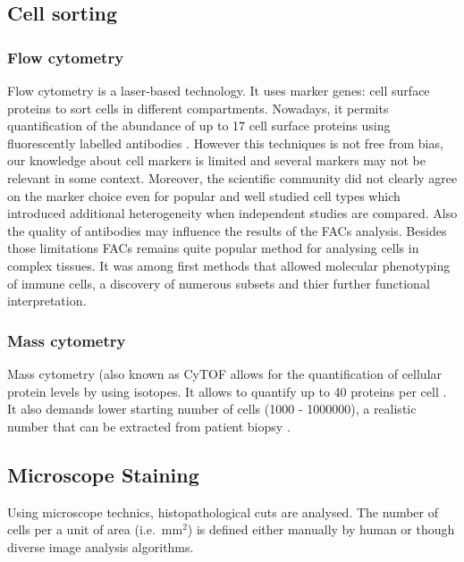 \documentclass[12pt,]{book}
\theoremstyle{definition}
\theoremstyle{definition}
\theoremstyle{definition}
\theoremstyle{remark}
\begin{document}
\hypertarget{facs}{%
\subsection{Cell sorting}\label{facs}}

\hypertarget{flow-cytometry}{%
\subsubsection{Flow cytometry}\label{flow-cytometry}}

Flow cytometry is a laser-based technology. It uses marker genes: cell
surface proteins to sort cells in different compartments. Nowadays, it
permits quantification of the abundance of up to 17 cell surface
proteins using fluorescently labelled antibodies \citep{Papalexi2017}.
However this techniques is not free from bias, our knowledge about cell
markers is limited and several markers may not be relevant in some
context. Moreover, the scientific community did not clearly agree on the
marker choice even for popular and well studied cell types which
introduced additional heterogeneity when independent studies are
compared. Also the quality of antibodies may influence the results of
the FACs analysis. Besides those limitations FACs remains quite popular
method for analysing cells in complex tissues. It was among first
methods that allowed molecular phenotyping of immune cells, a discovery
of numerous subsets and thier further functional interpretation.

\hypertarget{mass-cytometry}{%
\subsubsection{Mass cytometry}\label{mass-cytometry}}

Mass cytometry (also known as CyTOF allows for the quantification of
cellular protein levels by using isotopes. It allows to quantify up to
40 proteins per cell \citep{Papalexi2017}. It also demands lower
starting number of cells (1000 - 1000000), a realistic number that can
be extracted from patient biopsy \citep{Lyons2017}.

\hypertarget{staining}{%
\subsection{Microscope Staining}\label{staining}}

Using microscope technics, histopathological cuts are analysed. The
number of cells per a unit of area (i.e.~mm\(^2\)) is defined either
manually by human or though diverse image analysis algorithms.
\end{document}
